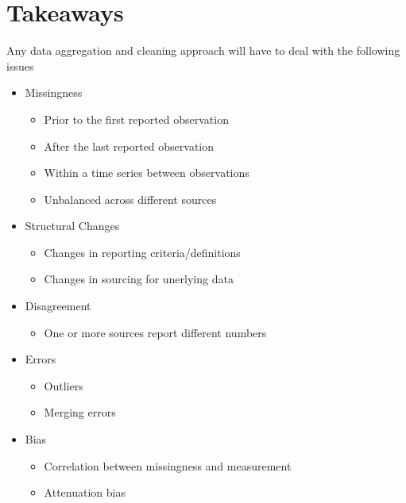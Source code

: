 \documentclass[
]{book}
\providecommand{\tightlist}{%
  \setlength{\itemsep}{0pt}\setlength{\parskip}{0pt}}
\begin{document}
\hypertarget{htmlwidget-6bb4ad18538fc14dd23f}{}

\hypertarget{takeaways}{%
\section{Takeaways}\label{takeaways}}

Any data aggregation and cleaning approach will have to deal with the following issues

\begin{itemize}
\tightlist
\item
  Missingness

  \begin{itemize}
  \tightlist
  \item
    Prior to the first reported observation
  \item
    After the last reported observation
  \item
    Within a time series between observations
  \item
    Unbalanced across different sources
  \end{itemize}
\item
  Structural Changes

  \begin{itemize}
  \tightlist
  \item
    Changes in reporting criteria/definitions
  \item
    Changes in sourcing for unerlying data
  \end{itemize}
\item
  Disagreement

  \begin{itemize}
  \tightlist
  \item
    One or more sources report different numbers
  \end{itemize}
\item
  Errors

  \begin{itemize}
  \tightlist
  \item
    Outliers
  \item
    Merging errors
  \end{itemize}
\item
  Bias

  \begin{itemize}
  \tightlist
  \item
    Correlation between missingness and measurement
  \item
    Attenuation bias
  \end{itemize}
\end{itemize}
\end{document}
